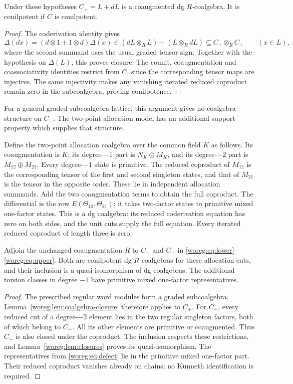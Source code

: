 \begin{lemma}\label{woreg:lem:coalgebra-closure}
Under these hypotheses \(C_+=L+dL\) is a coaugmented dg
\(R\)-coalgebra.  It is conilpotent if \(C\) is conilpotent.
\end{lemma}
\begin{proof}
The coderivation identity gives
\[
 \Delta(dx)=(d\otimes1+1\otimes d)\Delta(x)
       \in(dL\otimes_RL)+(L\otimes_RdL)
       \subseteq C_+\otimes_RC_+
 \qquad(x\in L),
\]
where the second summand uses the usual graded tensor sign.
Together with the hypothesis on \(\Delta(L)\), this proves closure.
The counit, coaugmentation and coassociativity identities restrict
from \(C\), since the corresponding tensor maps are injective.
The same injectivity makes any vanishing iterated reduced coproduct
remain zero in the subcoalgebra, proving conilpotence.
\end{proof}

For a general graded subcoalgebra lattice, this argument gives no
coalgebra structure on \(C_-\).  The two-point allocation model
has an additional support property which supplies that structure.

Define the two-point allocation coalgebra over the common field
\(K\) as follows.  Its coaugmentation is \(K\); its degree-\(-1\)
part is \(N_K\oplus M_K\), and its degree-\(-2\) part is
\(M_{12}\oplus M_{21}\).  Every degree-\(-1\) state is primitive.
The reduced coproduct of \(M_{12}\) is the corresponding tensor
of the first and second singleton states, and that of \(M_{21}\)
is the tensor in the opposite order.  These lie in independent
allocation summands.  Add the two coaugmentation terms to obtain
the full coproduct.  The differential is the row
\(E(\Theta_{12},\Theta_{21})\); it takes two-factor states to
primitive mixed one-factor states.  This is a dg coalgebra: its
reduced coderivation equation has zero on both sides, and the unit
cuts supply the full equation.  Every iterated reduced coproduct
of length three is zero.

\begin{proposition}\label{woreg:prop:regular-coalgebras}
Adjoin the unchanged coaugmentation \(R\) to \(C_-\) and
\(C_+\) in \eqref{woreg:eq:lower}--\eqref{woreg:eq:upper}.
Both are conilpotent dg \(R\)-coalgebras for these allocation cuts,
and their inclusion is a quasi-isomorphism of dg coalgebras.
The additional torsion classes in degree \(-1\) have primitive
mixed one-factor representatives.
\end{proposition}
\begin{proof}
The prescribed regular word modules form a graded subcoalgebra.
Lemma~\ref{woreg:lem:coalgebra-closure} therefore applies to \(C_+\).
For \(C_-\), every reduced cut of a degree-\(-2\) element lies in
the two regular singleton factors, both of which belong to \(C_-\).
All its other elements are primitive or coaugmented.  Thus \(C_-\)
is also closed under the coproduct.  The inclusion respects these
restrictions, and Lemma~\ref{woreg:lem:closures} proves its
quasi-isomorphism.  The representatives from
\eqref{woreg:eq:defect} lie in the primitive mixed one-factor part.
Their reduced coproduct vanishes already on chains; no K\"unneth
identification is required.
\end{proof}

